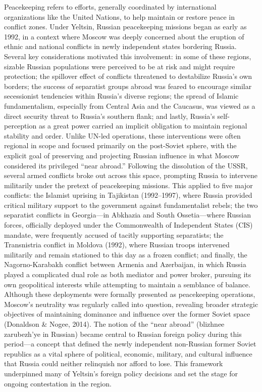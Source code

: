\documentclass[12pt]{article}
\begin{document}
Peacekeeping refers to efforts, generally coordinated by international organizations like the United Nations, to help maintain or restore peace in conflict zones. Under Yeltsin, Russian peacekeeping missions began as early as 1992, in a context where Moscow was deeply concerned about the eruption of ethnic and national conflicts in newly independent states bordering Russia. Several key considerations motivated this involvement: in some of these regions, sizable Russian populations were perceived to be at risk and might require protection; the spillover effect of conflicts threatened to destabilize Russia’s own borders; the success of separatist groups abroad was feared to encourage similar secessionist tendencies within Russia’s diverse regions; the spread of Islamic fundamentalism, especially from Central Asia and the Caucasus, was viewed as a direct security threat to Russia’s southern flank; and lastly, Russia’s self-perception as a great power carried an implicit obligation to maintain regional stability and order.
Unlike UN-led operations, these interventions were often regional in scope and focused primarily on the post-Soviet sphere, with the explicit goal of preserving and projecting Russian influence in what Moscow considered its privileged “near abroad.” Following the dissolution of the USSR, several armed conflicts broke out across this space, prompting Russia to intervene militarily under the pretext of peacekeeping missions. This applied to five major conflicts: the Islamist uprising in Tajikistan (1992–1997), where Russia provided critical military support to the government against fundamentalist rebels; the two separatist conflicts in Georgia—in Abkhazia and South Ossetia—where Russian forces, officially deployed under the Commonwealth of Independent States (CIS) mandate, were frequently accused of tacitly supporting separatists; the Transnistria conflict in Moldova (1992), where Russian troops intervened militarily and remain stationed to this day as a frozen conflict; and finally, the Nagorno-Karabakh conflict between Armenia and Azerbaijan, in which Russia played a complicated dual role as both mediator and power broker, pursuing its own geopolitical interests while attempting to maintain a semblance of balance.
Although these deployments were formally presented as peacekeeping operations, Moscow’s neutrality was regularly called into question, revealing broader strategic objectives of maintaining dominance and influence over the former Soviet space (Donaldson & Nogee, 2014). The notion of the “near abroad” (blizhnee zarubezh’ye in Russian) became central to Russian foreign policy during this period—a concept that defined the newly independent non-Russian former Soviet republics as a vital sphere of political, economic, military, and cultural influence that Russia could neither relinquish nor afford to lose. This framework underpinned many of Yeltsin’s foreign policy decisions and set the stage for ongoing contestation in the region.
\end{document}
